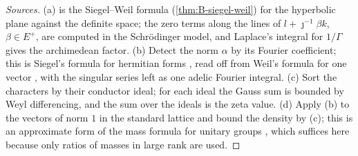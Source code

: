\begin{proof}[Sources]
(a) is the Siegel--Weil formula (\cref{thm:B-siegel-weil}) for the hyperbolic plane against the definite space; the zero terms along the lines of $l+\jmath^{-1}\beta k$, $\beta\in E^+$, are computed in the
Schr\"odinger model, and Laplace's integral for $1/\Gamma$ gives the archimedean factor. (b) Detect the norm $\alpha$ by its Fourier coefficient; this is Siegel's formula \cite{Siegel1935} for hermitian forms
\cite{Braun1941}, read off from Weil's formula for one vector \cite[Thm.~5]{Weil1965}, with the singular series left as one adelic Fourier integral. (c) Sort the characters by their conductor ideal; for
each ideal the Gauss sum is bounded by Weyl differencing, and the sum over the ideals is the zeta value. (d) Apply (b) to the vectors of norm $1$ in the standard lattice and bound the density by (c); this
is an approximate form of the mass formula for unitary groups \cite{GanHankeYu2001}, which suffices here because only ratios of masses in large rank are used.
\end{proof}

